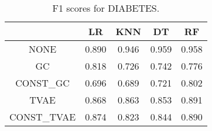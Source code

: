 \begin{table}
\caption{F1 scores for DIABETES.}
\label{tab:f1-DIABETES}
\begin{tabular}{ccccc}
\toprule
 & LR & KNN & DT & RF \\
\midrule
NONE & 0.890 & 0.946 & 0.959 & 0.958 \\
GC & 0.818 & 0.726 & 0.742 & 0.776 \\
CONST\_GC & 0.696 & 0.689 & 0.721 & 0.802 \\
TVAE & 0.868 & 0.863 & 0.853 & 0.891 \\
CONST\_TVAE & 0.874 & 0.823 & 0.844 & 0.890 \\
\bottomrule
\end{tabular}
\end{table}
